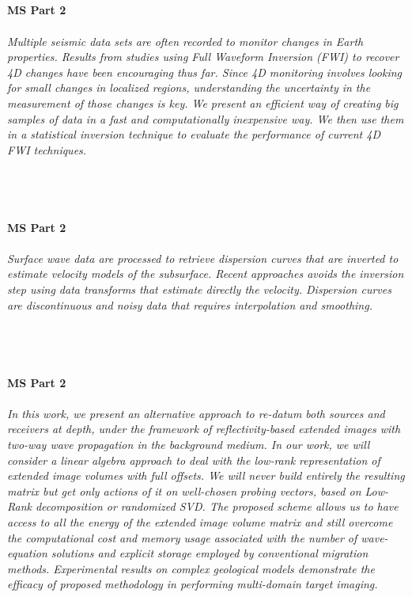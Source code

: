\begin{multicols}{2}
\\ 
    \\
    \\\\
    \noindent\textbf{MS Part 2}\\
\\  
    \textit{Multiple seismic data sets are often recorded to monitor changes in Earth properties. Results from studies using Full Waveform Inversion (FWI) to recover 4D changes have been encouraging thus far. Since 4D monitoring involves looking for small changes in localized regions, understanding the uncertainty in the measurement of those changes is key. We present an efficient way of creating big samples of data in a fast and computationally inexpensive way. We then use them in a statistical inversion technique to evaluate the performance of current 4D FWI techniques.}\\
\\ 
    \\
    \\\\
    \noindent\textbf{MS Part 2}\\
\\  
    \textit{Surface wave data are processed to retrieve dispersion curves that are inverted to estimate velocity models of the subsurface. Recent approaches avoids the inversion step using data transforms that estimate directly the velocity. Dispersion curves are discontinuous and noisy data that requires interpolation and smoothing.}\\
\\ 
    \\
    \\\\
    \noindent\textbf{MS Part 2}\\
\\  
    \textit{In this work, we present an alternative approach to re-datum both sources and receivers at depth, under the framework of reflectivity-based extended images with two-way wave propagation in the background medium. In our work, we will consider a linear algebra approach to deal with the low-rank representation of extended image volumes with full offsets. We will never build entirely the resulting matrix but get only actions of it on well-chosen probing vectors, based on Low-Rank decomposition or randomized SVD. The proposed scheme  allows us to have access to all the energy of the extended image volume matrix and still overcome the computational cost and memory usage associated with the number of wave-equation solutions and explicit storage employed by conventional migration methods. Experimental results on complex geological models demonstrate the efficacy of proposed methodology in performing multi-domain target imaging.}\\

\end{multicols}
